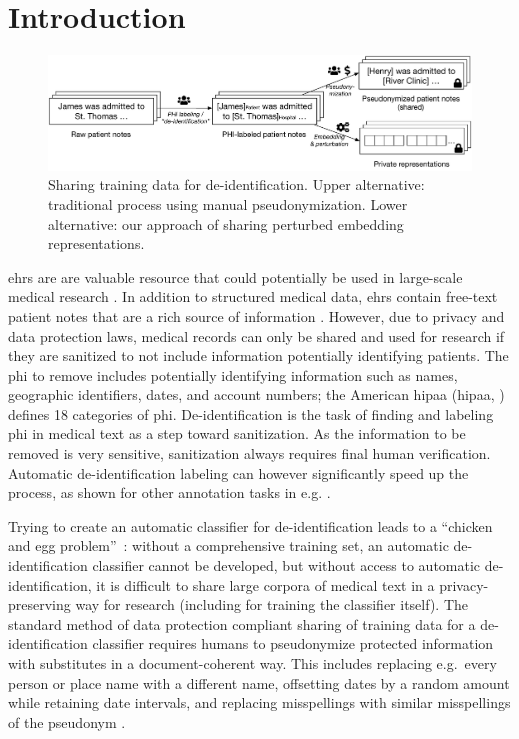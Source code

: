 
\section{Introduction}\label{sec:introduction}

\begin{figure}
    \centering
    \includegraphics[width=\textwidth]{images/graffle/sharing-both}
    \caption{Sharing training data for de-identification.
        Upper alternative: traditional process using manual pseudonymization.
        Lower alternative: our approach of sharing perturbed embedding representations.
    }\label{fig:process}
\end{figure}

%
\Acp{ehr} are are valuable resource that could potentially be used in large-scale medical research \citep{botsis2010secondary, birkhead2015uses, cowie2017electronic}.
%
In addition to structured medical data, \acp{ehr} contain free-text patient notes that are a rich source of information \citep{jensen2012mining}.
%
However, due to privacy and data protection laws, medical records can only be shared and used for research if they are sanitized to not include information potentially identifying patients.
%
The \ac{phi} to remove includes potentially identifying information such as names, geographic identifiers, dates, and account numbers; the American \acl{hipaa} (\acs{hipaa}, \citeyear{usa1996hipaa}) defines 18 categories of \ac{phi}.
%
De-identification is the task of finding and labeling \ac{phi} in medical text as a step toward sanitization.
%
As the information to be removed is very sensitive, sanitization always requires final human verification.
%
Automatic de-identification labeling can however significantly speed up the process, as shown for other annotation tasks in e.g. \citet{yimam2015todo}.

%
Trying to create an automatic classifier for de-identification leads to a ``chicken and egg problem''~\citep{uzuner2007evaluating}: without a comprehensive training set, an automatic de-identification classifier cannot be developed, but without access to automatic de-identification, it is difficult to share large corpora of medical text in a privacy-preserving way for research (including for training the classifier itself).
%
The standard method of data protection compliant sharing of training data for a de-identification classifier requires humans to pseudonymize protected information with substitutes in a document-coherent way.
%
This includes replacing e.g.\ every person or place name with a different name, offsetting dates by a random amount while retaining date intervals, and replacing misspellings with similar misspellings of the pseudonym \cite{uzuner2007evaluating}.

